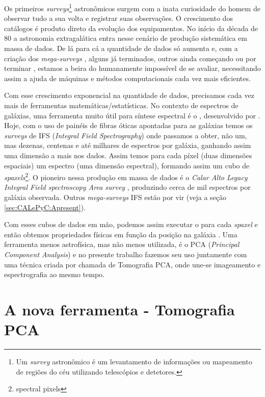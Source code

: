 Os primeiros {\em surveys}\footnote{Um {\em survey} astronômico é um
levantamento de informações ou mapeamento de regiões do céu utilizando
telescópios e detetores.} astronômicos surgem com a inata curiosidade do homem
de observar tudo a sua volta e registrar suas observações. O crescimento
dos catálogos é produto direto da evolução dos equipamentos. No início da década de 80
\citep{Huchra1983} \citep{Huchra1988} \citep{DaCosta1988} a astronomia
extragalática entra nesse cenário de produção sistemática em massa de dados. De
lá para cá a quantidade de dados só aumenta e, com a criação dos
{\em mega-surveys} \citep[\SDSS; ][]{York2000} \citep[2dFGRS;][]{Colless1999}
\citep[2MASS;][]{Skrutskie2006}, alguns já terminados, outros ainda começando ou
por terminar \citep[LSST; ][]{Ivezic2008} \citep[J-PAS;][]{Benitez2009},
estamos a beira do humanamente impossível de se avaliar, necessitando assim a
ajuda de máquinas e métodos computacionais cada vez mais eficientes.

Com esse crescimento exponencial na quantidade de dados, precisamos cada vez
mais de ferramentas matemáticas/estatísticas. No contexto de espectros de galáxias,
uma ferramenta muito útil para síntese espectral é o \starlight, desenvolvido
por \citet{CidFernandes2005}. Hoje, com o uso de painéis de fibras óticas
apontadas para as galáxias temos os {\em surveys} de IFS ({\em Integral Field
Spectrography}) onde passamos a obter, não um, mas dezenas, centenas e até
milhares de espectros por galáxia, ganhando assim uma dimensão a mais nos dados.
Assim temos para cada píxel (duas dimensões espaciais) um espectro (uma dimensão
espectral), formando assim um cubo de {\em spaxels}\footnote{spectral pixels}.
O pioneiro nessa produção em massa de dados é o {\em Calar Alto Legacy Integral
Field spectroscopy Area survey} \citep[CALIFA; ][]{CALIFAPresent2012},
produzindo cerca de mil espectros por galáxia observada. Outros {\em
mega-surveys} IFS estão por vir (veja a seção \ref{sec:CALePyC:Apresent}).

Com esses cubos de dados em mão, podemos assim executar o \starlight para
cada {\em spaxel} e então obtemos propriedades físicas em função da posição na
galáxia \citep{CidFernandes2013a}. Uma ferramenta menos astrofísica, mas não
menos utilizada, é o PCA ({\em Principal Component Analysis}) e no presente
trabalho fazemos seu uso juntamente com uma técnica criada por
\citet{Steiner2009} chamada de Tomografia PCA, onde une-se imageamento e
espectrografia ao mesmo tempo.

\section{A nova ferramenta - Tomografia PCA}
\label{sec:Intro:TomoPCA}

